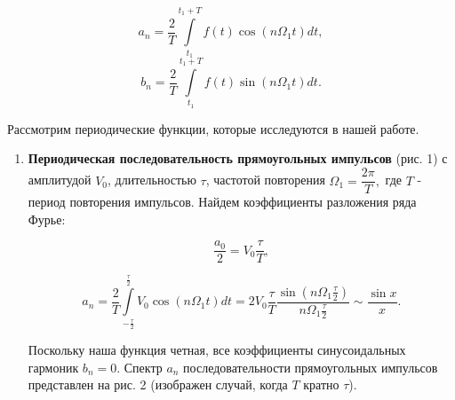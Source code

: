 \documentclass[a4paper,12pt]{article} %
\begin{document}
\begin{equation}
     a_{n}=\dfrac{2}{T}\int\limits_{t_{1}}^{t_{1}+T}f(t)\cos(n \Omega_{1} t)dt, 
     \label{eq2}
\end{equation}
\begin{equation}
    b_{n}=\dfrac{2}{T}\int\limits_{t_{1}}^{t_{1}+T}f(t)\sin(n \Omega_{1} t)dt.
    \label{eq3}
\end{equation}
  

	
	
	Рассмотрим периодические функции, которые исследуются в нашей
	работе.
	
	\begin{enumerate}
		
	\item 	\textbf{Периодическая последовательность прямоугольных импульсов} (рис. 1) с амплитудой $V_{0}$, длительностью $\tau$, частотой повторения $\Omega_{1}=\dfrac{2\pi}{T},$ где $T$ - период повторения импульсов. Найдем коэффициенты разложения ряда Фурье:
	
	$$\dfrac{a_{0}}{2}=V_{0}\dfrac{\tau}{T},$$

 \begin{equation}
     a_{n}=\dfrac{2}{T}\int\limits_{-\frac{\tau}{2}}^{\frac{\tau}{2}}V_{0}\cos(n \Omega_{1} t)dt=2V_{0}\dfrac{\tau}{T}\dfrac{\sin(n \Omega_{1} \frac{\tau}{2})}{n\Omega_{1}\frac{\tau}{2}} \sim \dfrac{\sin x}{x}.
    \label{eq4}
 \end{equation}

	
	Поскольку наша функция четная, все коэффициенты синусоидальных гармоник $b_{n}=0$. Спектр $a_{n}$ последовательности прямоугольных импульсов представлен на рис. 2 (изображен случай, когда $T$ кратно $\tau$).
		

\end{enumerate}
\end{document}

